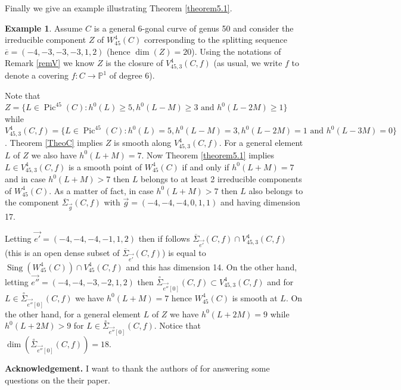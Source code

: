 \documentclass{article}
\DeclareMathOperator{\Pic}{Pic}
\DeclareMathOperator{\Sing}{Sing}
\theoremstyle{definition}
\newtheorem{example}{Example}
\theoremstyle{remark}
\begin{document}
Finally we give an example illustrating Theorem \ref{theorem5.1}.
\begin{example}\label{lastEx}
Assume $C$ is a general 6-gonal curve of genus 50 and consider the irreducible component $Z$ of $W^4_{45}(C)$ corresponding to the splitting sequence $\overline{e} = (-4,-3,-3,-3,1,2)$ (hence $\dim (Z)=20$).
Using the notations of Remark \ref{remV} we know $Z$ is the closure of $V^4_{45,3}(C,f)$ (as usual, we write $f$ to denote a covering $f : C \rightarrow \mathbb{P}^1$ of degree 6).

Note that $Z = \{ L \in \Pic^{45}(C) : h^0(L) \geq 5, h^0(L-M) \geq 3 \text { and } h^0(L-2M) \geq 1 \}$ while $V^4_{45,3}(C,f) = \{ L \in \Pic ^{45}(C): h^0(L)=5, h^0(L-M)=3, h^0(L-2M)=1 \text { and } h^0(L-3M)=0 \}$.
Theorem \ref{TheoC} implies $Z$ is smooth along $V^4_{45,3} (C,f)$.
For a general element $L$ of $Z$ we also have $h^0(L+M)=7$.
Now Theorem \ref{theorem5.1} implies $L \in V^4_{45,3}(C,f)$ is a smooth point of $W^4_{45}(C)$ if and only if $h^0(L+M)=7$ and in case $h^0(L+M) >7$ then $L$ belongs to at least 2 irreducible components of $W^4_{45}(C)$.
As a matter of fact, in case $h^0(L+M)>7$ then $L$ also belongs to the component $\overline{\Sigma}_{\overrightarrow{g}}(C,f)$ with $\overrightarrow {g}=(-4,-4,-4,0,1,1)$ and having dimension 17.

Letting $\overrightarrow {e'}=(-4,-4,-4,-1,1,2)$ then if follows $\overline{\Sigma}_{\overrightarrow {e'}}(C,f) \cap V^4_{45,3}(C,f)$ (this is an open dense subset of $\overline{\Sigma}_{\overrightarrow {e'}}(C,f)$) is equal to $\Sing (W^4_{45}(C)) \cap V^4_{45}(C,f)$ and this has dimension 14.
On the other hand, letting $\overrightarrow {e''}=(-4,-4,-3,-2,1,2)$ then $\overset{\circ}{\Sigma}_{\overrightarrow {e''}[0]}(C,f)\subset V^4_{45,3}(C,f)$ and for $L \in \overset{\circ}{\Sigma}_{\overrightarrow {e''}[0]}(C,f)$ we have $h^0(L+M)=7$ hence $W^4_{45}(C)$ is smooth at $L$.
On the other hand, for a general element $L$ of $Z$ we have $h^0(L+2M)=9$ while $h^0(L+2M)>9$ for $L \in \overset{\circ}{\Sigma}_{\overrightarrow {e''}[0]}(C,f)$.
Notice that $\dim (\overset{\circ}{\Sigma}_{\overrightarrow{e''}[0]}(C,f))=18$.
\end{example}

\textbf {Acknowledgement.} I want to thank the authors of \cite{FFR} for answering some questions on the their paper.

 
\end{document}
